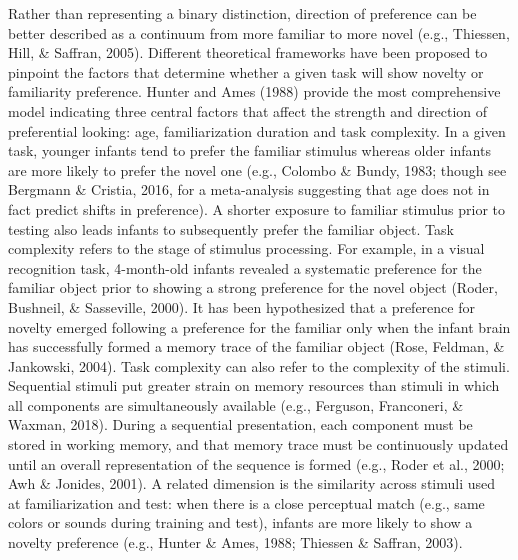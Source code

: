 \documentclass[english,man]{apa6}
\begin{document}
Rather than representing a binary distinction, direction of preference can be better described as a continuum from more familiar to more novel (e.g., Thiessen, Hill, \& Saffran, 2005). Different theoretical frameworks have been proposed to pinpoint the factors that determine whether a given task will show novelty or familiarity preference. Hunter and Ames (1988) provide the most comprehensive model indicating three central factors that affect the strength and direction of preferential looking: age, familiarization duration and task complexity. In a given task, younger infants tend to prefer the familiar stimulus whereas older infants are more likely to prefer the novel one (e.g., Colombo \& Bundy, 1983; though see Bergmann \& Cristia, 2016, for a meta-analysis suggesting that age does not in fact predict shifts in preference). A shorter exposure to familiar stimulus prior to testing also leads infants to subsequently prefer the familiar object. Task complexity refers to the stage of stimulus processing. For example, in a visual recognition task, 4-month-old infants revealed a systematic preference for the familiar object prior to showing a strong preference for the novel object (Roder, Bushneil, \& Sasseville, 2000). It has been hypothesized that a preference for novelty emerged following a preference for the familiar only when the infant brain has successfully formed a memory trace of the familiar object (Rose, Feldman, \& Jankowski, 2004). Task complexity can also refer to the complexity of the stimuli. Sequential stimuli put greater strain on memory resources than stimuli in which all components are simultaneously available (e.g., Ferguson, Franconeri, \& Waxman, 2018). During a sequential presentation, each component must be stored in working memory, and that memory trace must be continuously updated until an overall representation of the sequence is formed (e.g., Roder et al., 2000; Awh \& Jonides, 2001). A related dimension is the similarity across stimuli used at familiarization and test: when there is a close perceptual match (e.g., same colors or sounds during training and test), infants are more likely to show a novelty preference (e.g., Hunter \& Ames, 1988; Thiessen \& Saffran, 2003).
\end{document}
